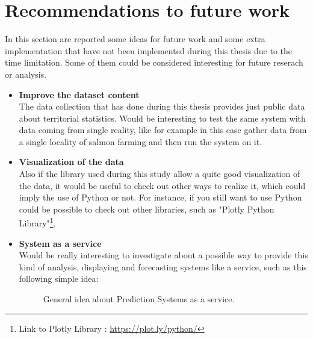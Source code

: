 \section{Recommendations to future work}
\label{Recommendations}
\vspace{-5mm}
In this section are reported some ideas for future work and some extra implementation that have not been implemented during this thesis due to the time limitation. Some of them could be considered interesting for future reserach or analysis.
\begin{itemize}
\item \textbf{Improve the dataset content}\\ The data collection that has done during this thesis provides just public data about territorial statistics. Would be interesting to test the same system with data coming from single reality, like for example in this case gather data from a single locality of salmon farming and then run the system on it.
\item \textbf{Visualization of the data}\\ Also if the library used during this study allow a quite good visualization of the data, it would be useful to check out other ways to realize it, which could imply the use of Python or not. For instance, if you still want to use Python could be possible to check out other libraries, such as "Plotly Python Library"\footnote{Link to Plotly Library : \url{https://plot.ly/python/}}.
\item \textbf{System as a service}\\ Would be really interesting to investigate about a possible way to provide this kind of analysis, displaying and forecasting systems like a service, such as this following simple idea:\\

\begin{figure}[H]
	\centering
    \caption{General idea about Prediction Systems as a service.}
\end{figure}


\end{itemize}
